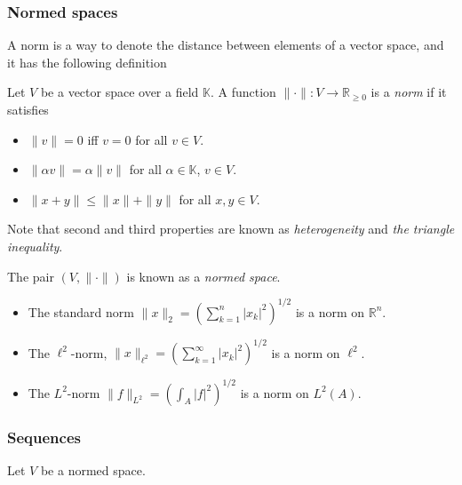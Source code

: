 \subsubsection{Normed spaces}
A norm is a way to denote the distance between elements of a vector space, and it has the following definition
\begin{defn}
Let $V$ be a vector space over a field $\mathbb{K}$. A function $\|\cdot\|:V\rightarrow\mathbb{R}_{\geq 0}$ is a \emph{norm} if it satisfies
\begin{itemize}
	\item $\|v\|=0$ iff $v=0$ for all $v\in V$.
	\item $\|\alpha v\|=\alpha\|v\|$ for all $\alpha\in\mathbb{K}$, $v\in V$.
	\item $\|x+y\|\leq \|x\|+\|y\|$ for all $x,y \in V$.
\end{itemize}
Note that second and third properties are known as \emph{heterogeneity} and \emph{the triangle inequality}.

The pair $(V, \|\cdot\|)$ is known as a \emph{normed space}.
\end{defn}

\begin{eg}
\begin{itemize}
	\item The standard norm $\|x\|_2=(\sum_{k=1}^n |x_k|^2)^{1/2}$ is a norm on $\mathbb{R}^n$.
	\item The $\ell^2$-norm, $\|x\|_{\ell^2}=\left(\sum_{k=1}^\infty |x_k|^2\right)^{1/2}$ is a norm on $\ell^2$.
	\item The $L^2$-norm $\|f\|_{L^2}=\left(\int_A |f|^2\right)^{1/2}$ is a norm on $L^2(A)$.
\end{itemize}
\end{eg}

\subsubsection{Sequences}
Let $V$ be a normed space. 